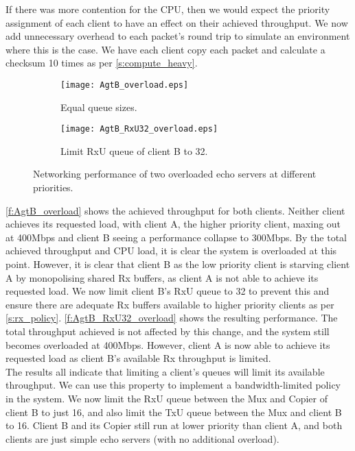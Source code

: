 If there was more contention for the CPU, then we would expect the priority assignment of each client to have an effect
on their achieved throughput. We now add unnecessary overhead to each packet's round trip to simulate an environment where
this is the case. We have each client copy each packet and calculate a checksum 10 times as per \autoref{s:compute_heavy}. 

\noindent\begin{figure}[H]
    \centering
	\begin{multicols}{2}
		\begin{subfigure}[b]{0.45\textwidth}
        \centering
        \texttt{[image: AgtB\_overload.eps]}
        \caption{Equal queue sizes.}
        \label{f:AgtB_overload}
    \end{subfigure}\qquad
    \begin{subfigure}[b]{0.45\textwidth}
        \centering
        \texttt{[image: AgtB\_RxU32\_overload.eps]}
        \caption{Limit RxU queue of client B to 32.}
        \label{f:AgtB_RxU32_overload}
    \end{subfigure}
\end{multicols}
\caption{Networking performance of two overloaded echo servers at different priorities.}
\label{f:AgtB_od}
\end{figure}

\autoref{f:AgtB_overload} shows the achieved throughput for both clients. Neither client achieves its requested load, with client A,
the higher priority client, maxing out at 400Mbps and client B seeing a performance collapse to 300Mbps. By the total achieved throughput
and CPU load, it is clear the system is overloaded at this point. However, it is clear that client B as the low priority client is 
starving client A by monopolising shared Rx buffers, as client A is not able to achieve its requested load. We now limit client B's RxU queue
to 32 to prevent this and ensure there are adequate Rx buffers available to higher priority clients as per \autoref{s:rx_policy}. 
\autoref{f:AgtB_RxU32_overload} shows the resulting performance. The total throughput achieved is not affected by this change, and the
system still becomes overloaded at 400Mbps. However, client A is now able to achieve its requested load as client B's available
Rx throughput is limited. \\

The results all indicate that limiting a client's queues will limit its available throughput. We can use this property to implement 
a bandwidth-limited policy in the system. We now limit the RxU queue between the Mux and Copier of client B to just 16, and also
limit the TxU queue between the Mux and client B to 16. Client B and its Copier still run at lower priority than client A, and both
clients are just simple echo servers (with no additional overload).

